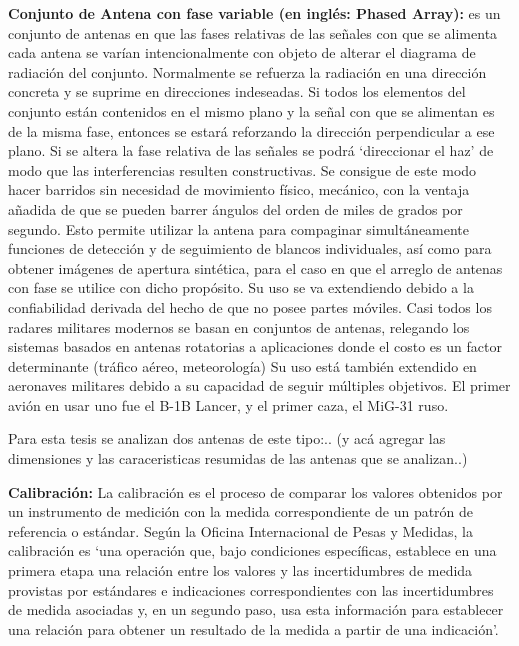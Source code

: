 {\textbf{Conjunto de Antena con fase variable (en inglés: Phased Array):}} es un conjunto de antenas en que las fases relativas
de las señales con que se alimenta cada antena se varían intencionalmente con objeto de alterar el diagrama de radiación del
conjunto. Normalmente se refuerza la radiación en una dirección concreta y se suprime en direcciones indeseadas. Si todos los
elementos del conjunto están contenidos en el mismo plano y la señal con que se alimentan es de la misma fase,
entonces se estará reforzando la dirección perpendicular a ese plano. Si se altera la fase relativa de las señales se podrá
\enquote*{direccionar el haz} de modo que las interferencias resulten constructivas. Se consigue de este modo hacer barridos sin
necesidad de movimiento físico, mecánico, con la ventaja añadida de que se pueden barrer ángulos del orden de miles de grados
por segundo. Esto permite utilizar la antena para compaginar simultáneamente funciones de detección y de seguimiento de blancos
individuales, así como para obtener imágenes de apertura sintética, para el caso en que el arreglo de antenas con fase se 
utilice con dicho propósito. Su uso se va extendiendo debido a la confiabilidad derivada del hecho de que no posee partes
móviles. Casi todos los radares militares modernos se basan en conjuntos de antenas, relegando los sistemas basados en antenas
rotatorias a aplicaciones donde el costo es un factor determinante (tráfico aéreo, meteorología) Su uso está también 
extendido en aeronaves militares debido a su capacidad de seguir múltiples objetivos. El primer avión en usar uno fue el B-1B
Lancer, y el primer caza, el MiG-31 ruso.\\

Para esta tesis se analizan dos antenas de este tipo:.. (y acá agregar las dimensiones y las caraceristicas resumidas de las antenas que se analizan..)

{\textbf{Calibración:}} La calibración es el proceso de comparar los valores obtenidos por un instrumento de medición con la
medida correspondiente de un patrón de referencia o estándar. Según la Oficina Internacional de Pesas y Medidas, la 
calibración es \enquote*{una operación que, bajo condiciones específicas, establece en una primera etapa una relación entre
los valores y las incertidumbres de medida provistas por estándares e indicaciones correspondientes con las incertidumbres de 
medida asociadas y, en un segundo paso, usa esta información para establecer una relación para obtener un resultado de la 
medida a partir de una indicación}.


